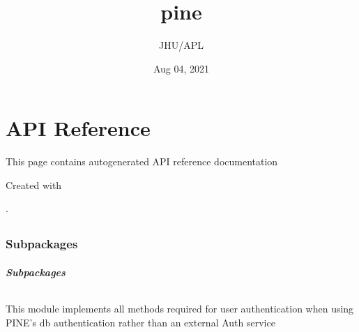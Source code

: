 \documentclass[letterpaper,10pt,english]{sphinxmanual}
\title{pine}
\date{Aug 04, 2021}
\author{JHU/APL}
\begin{document}
\pagestyle{empty}
\sphinxmaketitle
\pagestyle{plain}
\sphinxtableofcontents
\pagestyle{normal}
\label{\detokenize{index::doc}}



\chapter{API Reference}
\label{\detokenize{autoapi/index:api-reference}}\label{\detokenize{autoapi/index::doc}}
\sphinxAtStartPar
This page contains auto\sphinxhyphen{}generated API reference documentation %
\begin{footnote}[1]\sphinxAtStartFootnote
Created with 
%
\end{footnote}.


\section{}
\label{\detokenize{autoapi/pine/index:module-pine}}\label{\detokenize{autoapi/pine/index:pine}}\label{\detokenize{autoapi/pine/index::doc}}

\subsection{Subpackages}
\label{\detokenize{autoapi/pine/index:subpackages}}

\subsubsection{}
\label{\detokenize{autoapi/pine/backend/index:module-pine.backend}}\label{\detokenize{autoapi/pine/backend/index:pine-backend}}\label{\detokenize{autoapi/pine/backend/index::doc}}

\paragraph{Subpackages}
\label{\detokenize{autoapi/pine/backend/index:subpackages}}

\subparagraph{}
\label{\detokenize{autoapi/pine/backend/admin/index:module-pine.backend.admin}}\label{\detokenize{autoapi/pine/backend/admin/index:pine-backend-admin}}\label{\detokenize{autoapi/pine/backend/admin/index::doc}}
\sphinxAtStartPar
This module implements all methods required for user authentication when using PINE’s db authentication rather than
an external Auth service
\end{document}
